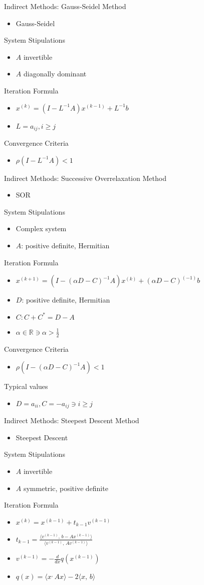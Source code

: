 \documentclass[9pt, serif]{beamer}
\newlength{\wideitemsep}
\let\olditem\item
\renewcommand{\item}{\setlength{\itemsep}{\wideitemsep}\olditem}
\newcommand{\bi}{\begin{itemize}}
\newcommand{\ei}{\end{itemize}}
\begin{document}
\begin{frame}{Indirect Methods: Gauss-Seidel}
    Method
    \bi
        \item Gauss-Seidel
    \ei
    System Stipulations
    \bi
        \item $A$ invertible
        \item $A$ diagonally dominant
    \ei
    Iteration Formula
    \bi
        \item $x^{(k)} = (I-L^{-1}A)x^{(k-1)}+L^{-1}b$
        \item $L = a_{ij}, i \ge j$ 
    \ei
    Convergence Criteria
    \bi
        \item $\rho(I-L^{-1}A)<1$
    \ei
\end{frame}


\begin{frame}{Indirect Methods: Successive Overrelaxation}
    Method
    \bi
        \item SOR
    \ei
    System Stipulations
    \bi
        \item Complex system
        \item $A$: positive definite, Hermitian
    \ei
    Iteration Formula
    \bi
        \item $x^{(k+1)}=(I-(\alpha D-C)^{-1}A)x^{(k)}+(\alpha D-C)^{(-1)}b$
        \item $D$: positive definite, Hermitian
        \item $C: C+C^*=D-A$
        \item $\alpha\in\mathbb{R} \ni \alpha>\frac{1}{2}$
    \ei
    Convergence Criteria
    \bi
        \item $\rho(I-(\alpha D-C)^{-1}A)<1$
    \ei
    Typical values
    \bi
        \item $D = a_{ii}, C = -a_{ij} \ni i \ge j$
    \ei
\end{frame}


\begin{frame}{Indirect Methods: Steepest Descent}
    Method
    \bi
        \item Steepest Descent
    \ei
    System Stipulations
    \bi
        \item $A$ invertible
        \item $A$ symmetric, positive definite
    \ei
    Iteration Formula
    \bi
        \item $x^{(k)} = x^{(k-1)}+t_{k-1}v^{(k-1)}$
        \item $t_{k-1} = \frac{\langle v^{(k-1)},\, b - Ax^{(k-1)}\rangle}{\langle v^{(k-1)},\, Av^{(k-1)} \rangle}$
        \item $v^{(k-1)} = -\frac{d}{dx} q(x^{(k-1)})$
        \item $q(x) = \langle x^,\, Ax \rangle - 2 \langle x,\, b \rangle$
    \ei
\end{frame}
\end{document}

